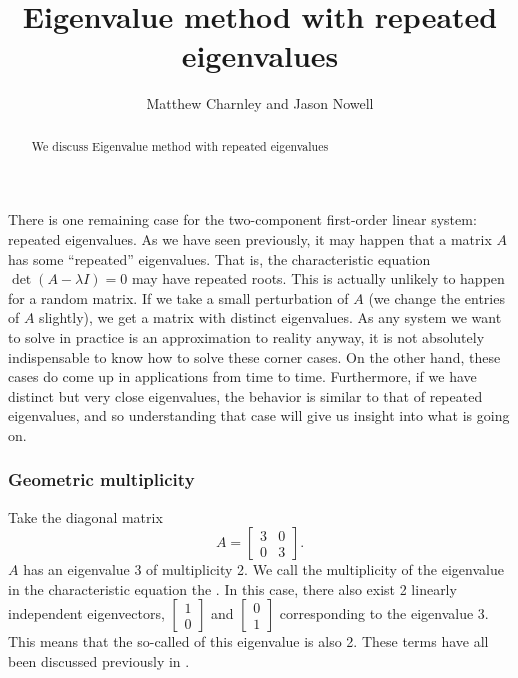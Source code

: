 \documentclass{ximera}
\title{Eigenvalue method with repeated eigenvalues}
\author{Matthew Charnley and Jason Nowell}
\begin{document}
\begin{abstract}
    We discuss Eigenvalue method with repeated eigenvalues
\end{abstract}
\maketitle

\label{eigenmethod-repeat:section}


There is one remaining case for the two-component first-order linear system: repeated eigenvalues. As we have seen previously, it may happen that a matrix $A$ has some ``repeated'' eigenvalues. That is, the characteristic equation $\det(A-\lambda I) = 0$ may have repeated roots.  This is actually unlikely to happen for a random matrix.  If we take a small perturbation of $A$ (we change the entries of $A$ slightly), we get a matrix with distinct eigenvalues.  As any system we want to solve in practice is an approximation to reality anyway, it is not absolutely indispensable to know how to solve these corner cases. On the other hand, these cases do come up in applications from time to time. Furthermore, if we have distinct but very close eigenvalues, the behavior is similar to that of repeated eigenvalues, and so understanding that case will give us insight into what is going on.

\subsubsection{Geometric multiplicity}

Take the diagonal matrix
\begin{equation*}
    A =
    \begin{bmatrix}
        3 & 0 \\ 
        0 & 3
    \end{bmatrix} .
\end{equation*}
$A$ has an eigenvalue 3 of multiplicity 2.  We call the multiplicity of the eigenvalue in the characteristic equation the \emph{}.  In this case, there also exist 2 linearly independent eigenvectors, $\left[ \begin{smallmatrix} 1 \\ 0 \end{smallmatrix} \right]$ and $\left[ \begin{smallmatrix} 0 \\ 1 \end{smallmatrix} \right]$ corresponding to the eigenvalue 3.  This means that the so-called \emph{} of this eigenvalue is also 2. These terms have all been discussed previously in .
\end{document}
